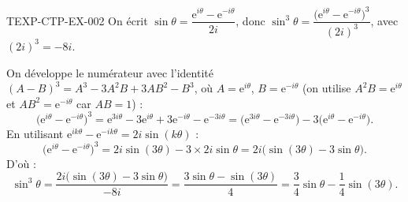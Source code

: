 \begin{corrige}{TEXP-CTP-EX-002}
On écrit $\sin\theta = \dfrac{\mathrm{e}^{i\theta}-\mathrm{e}^{-i\theta}}{2i}$, donc $\sin^3\theta = \dfrac{\big(\mathrm{e}^{i\theta}-\mathrm{e}^{-i\theta}\big)^3}{(2i)^3}$, avec $(2i)^3=-8i$.

On développe le numérateur avec l'identité $(A-B)^3=A^3-3A^2B+3AB^2-B^3$, où $A=\mathrm{e}^{i\theta}$, $B=\mathrm{e}^{-i\theta}$ (on utilise $A^2B=\mathrm{e}^{i\theta}$ et $AB^2=\mathrm{e}^{-i\theta}$ car $AB=1$) :
\[
  \big(\mathrm{e}^{i\theta}-\mathrm{e}^{-i\theta}\big)^3 = \mathrm{e}^{3i\theta} - 3\mathrm{e}^{i\theta} + 3\mathrm{e}^{-i\theta} - \mathrm{e}^{-3i\theta} = \big(\mathrm{e}^{3i\theta}-\mathrm{e}^{-3i\theta}\big) - 3\big(\mathrm{e}^{i\theta}-\mathrm{e}^{-i\theta}\big).
\]
En utilisant $\mathrm{e}^{ik\theta}-\mathrm{e}^{-ik\theta}=2i\sin(k\theta)$ :
\[
  \big(\mathrm{e}^{i\theta}-\mathrm{e}^{-i\theta}\big)^3 = 2i\sin(3\theta) - 3\times2i\sin\theta = 2i\big(\sin(3\theta)-3\sin\theta\big).
\]
D'où :
\[
  \sin^3\theta = \frac{2i\big(\sin(3\theta)-3\sin\theta\big)}{-8i} = \frac{3\sin\theta-\sin(3\theta)}{4} = \frac{3}{4}\sin\theta - \frac{1}{4}\sin(3\theta).
\]
\end{corrige}
